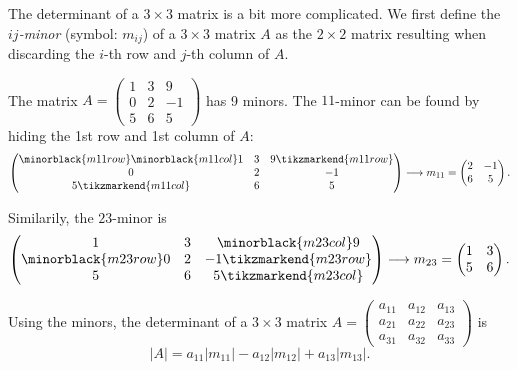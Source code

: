 The determinant of a $3\times3$ matrix is a bit more complicated. We first define the \emph{$ij$-minor} (symbol: $m_{ij}$) of a $3\times3$ matrix $A$ as the $2\times2$ matrix resulting when discarding the $i$-th row and $j$-th column of $A$.
\begin{example}
  The matrix $A=\begin{pmatrix} 1 & 3 & 9 \\ 0 & 2 & -1 \\ 5 & 6 & 5 \end{pmatrix}$ has 9 minors. The $11$-minor can be found by hiding the 1st row and 1st column of $A$:
  \begin{equation*}
	\begin{pmatrix} \minorblack{m11row}\minorblack{m11col}1 & 3 & 9\tikzmarkend{m11row} \\ 0 & 2 & -1 \\ 5\tikzmarkend{m11col} & 6 & 5 \end{pmatrix} \longrightarrow m_{11} = \begin{pmatrix} 2 & -1 \\ 6 & 5 \end{pmatrix}.
  \end{equation*}

  Similarily, the $23$-minor is
  \begin{equation*}
	\begin{pmatrix} 1 & 3 & \minorblack{m23col}9 \\ \minorblack{m23row}0 & 2 & -1\tikzmarkend{m23row} \\ 5 & 6 & 5\tikzmarkend{m23col} \end{pmatrix} \longrightarrow m_{23} = \begin{pmatrix} 1 & 3 \\ 5 & 6 \end{pmatrix}.
  \end{equation*}
\end{example}
Using the minors, the determinant of a $3\times3$ matrix $A=\begin{pmatrix} a_{11} & a_{12} & a_{13} \\ a_{21} & a_{22} & a_{23} \\ a_{31} & a_{32} & a_{33} \end{pmatrix}$ is
\begin{equation*}
  |A| = a_{11}\left|m_{11}\right| - a_{12}\left|m_{12}\right| + a_{13}\left|m_{13}\right|.
\end{equation*}
